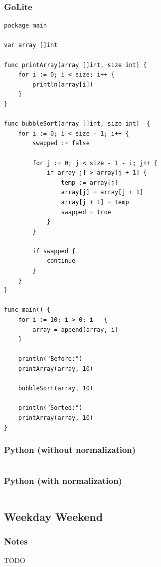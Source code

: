 \documentclass{article}
\begin{document}
\subsubsection{GoLite}
\begin{lstlisting}
package main

var array []int

func printArray(array []int, size int) {
    for i := 0; i < size; i++ {
        println(array[i])
    }
}

func bubbleSort(array []int, size int)  {
    for i := 0; i < size - 1; i++ {
        swapped := false

        for j := 0; j < size - 1 - i; j++ {
            if array[j] > array[j + 1] {
                temp := array[j]
                array[j] = array[j + 1]
                array[j + 1] = temp
                swapped = true
            }
        }

        if swapped {
            continue
        }
    }
}

func main() {
    for i := 10; i > 0; i-- {
        array = append(array, i)
    }

    println("Before:")
    printArray(array, 10)

    bubbleSort(array, 10)

    println("Sorted:")
    printArray(array, 10)
}
\end{lstlisting}
\subsubsection{Python (without normalization)}
\begin{lstlisting}
\end{lstlisting}
\subsubsection{Python (with normalization)}
\begin{lstlisting}

\end{lstlisting}








\subsection{Weekday Weekend}
\subsubsection{Notes}
TODO 
\end{document}

